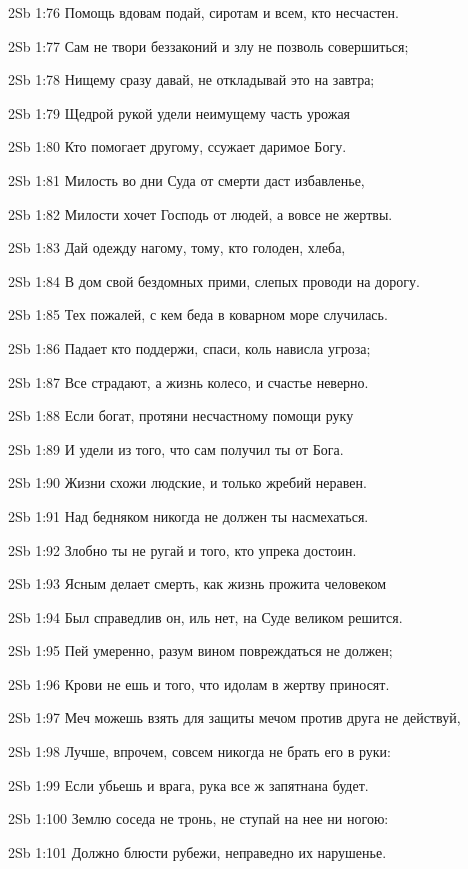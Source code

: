 \vs 2Sb 1:76 Помощь вдовам подай, сиротам и всем, кто несчастен.

\vs 2Sb 1:77 Сам не твори беззаконий и злу не позволь совершиться;

\vs 2Sb 1:78 Нищему сразу давай, не откладывай это на завтра;

\vs 2Sb 1:79 Щедрой рукой удели неимущему часть урожая  

\vs 2Sb 1:80 Кто помогает другому, ссужает даримое Богу.

\vs 2Sb 1:81 Милость во дни Суда от смерти даст избавленье,

\vs 2Sb 1:82 Милости хочет Господь от людей, а вовсе не жертвы.

\vs 2Sb 1:83 Дай одежду нагому, тому, кто голоден, хлеба,

\vs 2Sb 1:84 В дом свой бездомных прими, слепых проводи на дорогу. 

\vs 2Sb 1:85 Тех пожалей, с кем беда в коварном море случилась.

\vs 2Sb 1:86 Падает кто  поддержи, спаси, коль нависла угроза;

\vs 2Sb 1:87 Все страдают, а жизнь  колесо, и счастье неверно.

\vs 2Sb 1:88 Если богат, протяни несчастному помощи руку

\vs 2Sb 1:89 И удели из того, что сам получил ты от Бога. 

\vs 2Sb 1:90 Жизни схожи людские, и только жребий неравен.

\vs 2Sb 1:91 Над бедняком никогда не должен ты насмехаться.

\vs 2Sb 1:92 Злобно ты не ругай и того, кто упрека достоин.

\vs 2Sb 1:93 Ясным делает смерть, как жизнь прожита человеком 

\vs 2Sb 1:94 Был справедлив он, иль нет, на Суде великом решится. 

\vs 2Sb 1:95 Пей умеренно, разум вином повреждаться не должен;

\vs 2Sb 1:96 Крови не ешь и того, что идолам в жертву приносят.

\vs 2Sb 1:97 Меч можешь взять для защиты  мечом против друга не действуй,

\vs 2Sb 1:98 Лучше, впрочем, совсем никогда не брать его в руки:

\vs 2Sb 1:99 Если убьешь и врага, рука все ж запятнана будет. 

\vs 2Sb 1:100 Землю соседа не тронь, не ступай на нее ни ногою:

\vs 2Sb 1:101 Должно блюсти рубежи, неправедно их нарушенье.


